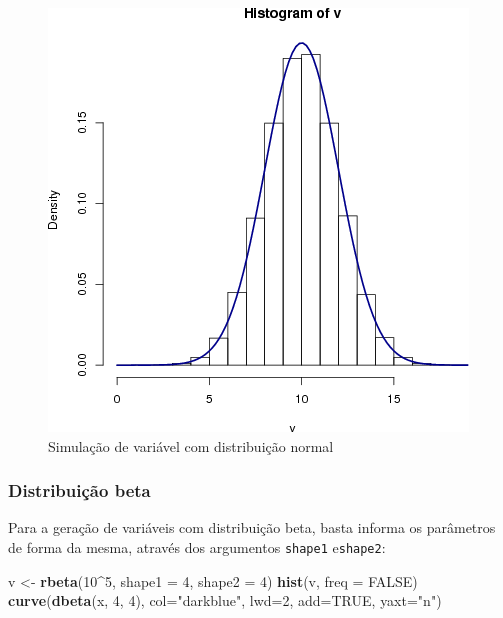 \documentclass[a4paper]{article}
\newenvironment{Shaded}{\begin{snugshade}}{\end{snugshade}}
\newcommand{\KeywordTok}[1]{\textcolor[rgb]{0.13,0.29,0.53}{\textbf{#1}}}
\newcommand{\DataTypeTok}[1]{\textcolor[rgb]{0.13,0.29,0.53}{#1}}
\newcommand{\DecValTok}[1]{\textcolor[rgb]{0.00,0.00,0.81}{#1}}
\newcommand{\StringTok}[1]{\textcolor[rgb]{0.31,0.60,0.02}{#1}}
\newcommand{\OtherTok}[1]{\textcolor[rgb]{0.56,0.35,0.01}{#1}}
\newcommand{\OperatorTok}[1]{\textcolor[rgb]{0.81,0.36,0.00}{\textbf{#1}}}
\newcommand{\NormalTok}[1]{#1}
\begin{document}
\begin{figure}[H]

{\centering \includegraphics[width=0.7\linewidth]{images/rnorm-1} 

}

\caption{Simulação de variável com distribuição normal}\label{fig:rnorm}
\end{figure}

\subsubsection{Distribuição beta}\label{distribuicao-beta}

Para a geração de variáveis com distribuição beta, basta informa os
parâmetros de forma da mesma, através dos argumentos \texttt{shape1}
e\texttt{shape2}:

\begin{Shaded}
\begin{Highlighting}[]
\NormalTok{v <-}\StringTok{ }\KeywordTok{rbeta}\NormalTok{(}\DecValTok{10}\OperatorTok{^}\DecValTok{5}\NormalTok{, }\DataTypeTok{shape1 =} \DecValTok{4}\NormalTok{, }\DataTypeTok{shape2 =} \DecValTok{4}\NormalTok{)}
\KeywordTok{hist}\NormalTok{(v, }\DataTypeTok{freq =} \OtherTok{FALSE}\NormalTok{)}
\KeywordTok{curve}\NormalTok{(}\KeywordTok{dbeta}\NormalTok{(x, }\DecValTok{4}\NormalTok{, }\DecValTok{4}\NormalTok{), }
          \DataTypeTok{col=}\StringTok{"darkblue"}\NormalTok{, }\DataTypeTok{lwd=}\DecValTok{2}\NormalTok{, }\DataTypeTok{add=}\OtherTok{TRUE}\NormalTok{, }\DataTypeTok{yaxt=}\StringTok{"n"}\NormalTok{)}
\end{Highlighting}
\end{Shaded}
\end{document}
